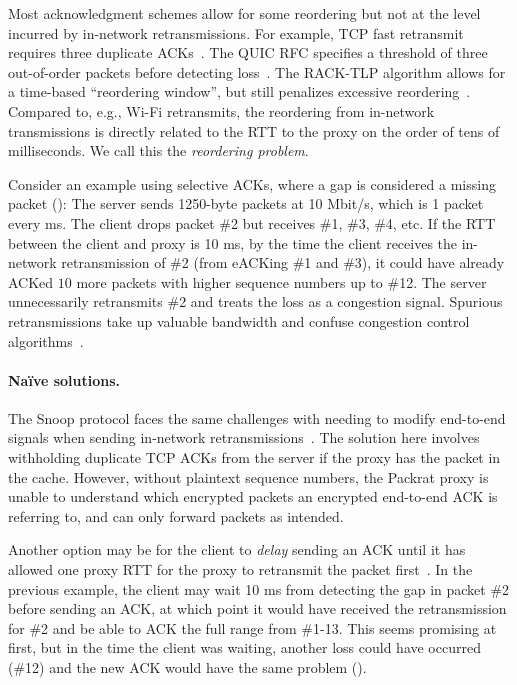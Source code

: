 Most acknowledgment schemes allow for some reordering but not at the level
incurred by in-network retransmissions. For example, TCP fast retransmit requires
three duplicate ACKs~\cite{rfc5681tcp}. The QUIC RFC specifies a threshold of three
out-of-order packets before detecting loss~\cite{rfc9002quic}. The RACK-TLP algorithm
allows for a time-based ``reordering window'', but still penalizes excessive
reordering~\cite{rfc8985}. Compared to, e.g., Wi-Fi retransmits, the
reordering from in-network transmissions is directly related to the RTT to
the proxy on the order of tens of milliseconds.
We call this the \textit{reordering problem}.

Consider an example using selective ACKs, where a gap is considered a missing
packet (): The server sends 1250-byte packets at 10 Mbit/s,
which is 1 packet every ms. The client drops packet \#2 but
receives \#1, \#3, \#4, etc. If the RTT between the client and proxy is 10 ms,
by the time the client receives the in-network retransmission of \#2 (from
eACKing \#1 and \#3), it could
have already ACKed $10$ more packets with higher sequence
numbers up to \#12. The server unnecessarily retransmits \#2 and treats the
loss as a congestion signal.
Spurious retransmissions take up valuable bandwidth and confuse congestion
control algorithms~\cite{leung2007overview}.

\paragraph{Na\"ive solutions.}

The Snoop protocol faces the same challenges with needing to modify end-to-end
signals when sending in-network retransmissions~\cite
{balakrishnan1995snoop}. The solution here involves withholding duplicate TCP
ACKs from the server if the proxy has the packet in the cache. However, without
plaintext sequence numbers, the Packrat proxy is unable to understand which
encrypted packets an encrypted end-to-end ACK is referring to, and can only
forward packets as intended.

Another option may be for the client to \textit{delay} sending an ACK until it
has allowed one proxy RTT for the proxy to retransmit the packet first~\cite{rfc3168}.
In the
previous example, the client may wait 10 ms from detecting the gap in
packet \#2 before sending an ACK, at which point it would have received the
retransmission for \#2 and be able to ACK the full range from \#1-13. This
seems promising at first, but in the time the client was waiting,
another loss could have occurred (\#12)
and the new ACK would have the same problem ().

